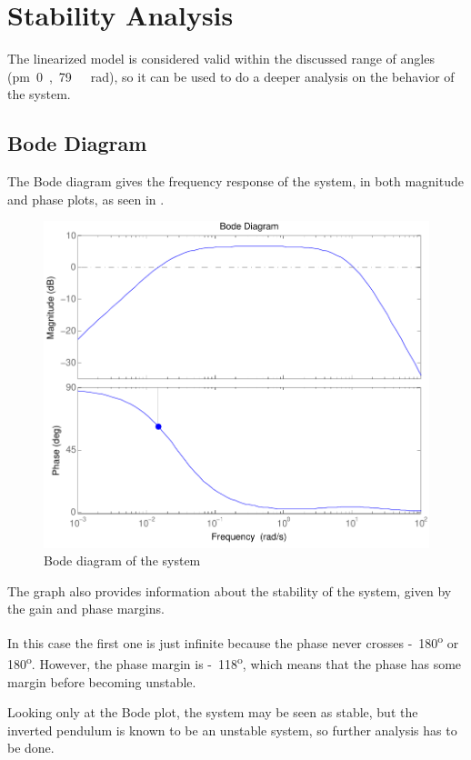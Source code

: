 \section{Stability Analysis}
The linearized model is considered valid within the discussed range of angles (\si{\pm 0,79\ rad}), so it can be used to do a deeper analysis on the behavior of the system. %

\subsection{Bode Diagram}
The Bode diagram gives the frequency response of the system, in both magnitude and phase plots, as seen in .
\begin{figure}[H] 
	\centering 
	\includegraphics[scale=0.65]{figures/bodeTF}
	\caption{Bode diagram of the system}
	\label{bodeTF}
\end{figure} 

The graph also provides information about the stability of the system, given by the gain and phase margins. 

In this case the first one is just infinite because the phase never crosses \si{-180^o} or \si{180^o}. However, the phase margin is \si{-118^o}, which means that the phase has some margin before becoming unstable.

Looking only at the Bode plot, the system may be seen as stable, but the inverted pendulum is known to be an unstable system, so further analysis has to be done.

